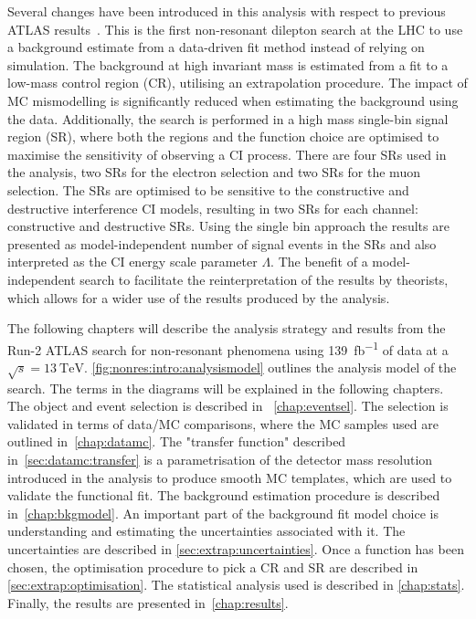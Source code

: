 Several changes have been introduced in this analysis with respect to previous ATLAS results~\cite{EXOT-2016-05}. This is the first non-resonant dilepton search at the LHC to use a background estimate from a data-driven fit method instead of relying on simulation. The background at high invariant mass is estimated from a fit to a low-mass control region (CR), utilising an extrapolation procedure. The impact of MC mismodelling is significantly reduced when estimating the background using the data. Additionally, the search is performed in a high mass single-bin signal region (SR), where both the regions and the function choice are optimised to maximise the sensitivity of observing a CI process. There are four SRs used in the analysis, two SRs for the electron selection and two SRs for the muon selection. The SRs are optimised to be sensitive to the constructive and destructive interference CI models, resulting in two SRs for each channel: constructive and destructive SRs. Using the single bin approach the results are presented as  model-independent number of signal events in the SRs and also interpreted as the CI energy scale parameter $\Lambda$. The benefit of a model-independent search to facilitate the reinterpretation of the results by theorists, which allows for a wider use of the results produced by the analysis. 

The following chapters will describe the analysis strategy and results from the Run-2 ATLAS search for non-resonant phenomena using \SI{139}{\femto\barn^{-1}} of data at a $\sqrt{s}=\SI{13}{\tera\electronvolt}$. \cref{fig:nonres:intro:analysismodel} outlines the analysis model of the search. The terms in the diagrams will be explained in the following chapters. The object and event selection is described in ~\cref{chap:eventsel}. The selection is validated in terms of data/MC comparisons, where the MC samples used are outlined in~\cref{chap:datamc}. The "transfer function" described in~\cref{sec:datamc:transfer} is a parametrisation of the detector mass resolution introduced in the analysis to produce smooth MC templates, which are used to validate the functional fit. The background estimation procedure is described in~\cref{chap:bkgmodel}. An important part of the background fit model choice is understanding and estimating the uncertainties associated with it. The uncertainties are described in \cref{sec:extrap:uncertainties}. Once a function has been chosen, the optimisation procedure to pick a CR and SR are described in \cref{sec:extrap:optimisation}. The statistical analysis used is described in \cref{chap:stats}. Finally, the results are presented in~\cref{chap:results}. 

